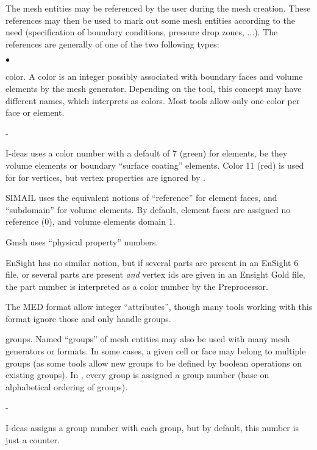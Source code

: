 {{{The mesh entities may be referenced by the user during the mesh
creation. These references may then be used to mark out some mesh entities
according to the need (specification of boundary conditions, pressure
drop zones, ...). The references are generally of one of the two
following types:
\begin{list}{$\bullet$}{}
\item color.
A color is an integer possibly associated with boundary faces and
volume elements by the mesh generator. Depending on the tool,
this concept may have different names, which \CS interprets
as colors. Most tools allow only one color per face or element.
      \begin{list}{-}{}
      \item I-deas uses a color number with a default of
            7 (green) for elements, be they volume elements or boundary
            ``surface coating'' elements. Color 11 (red) is used for
            for vertices, but vertex properties are ignored by \CS.
      \item SIMAIL uses the equivalent notions of ``reference''
            for element faces, and ``subdomain'' for volume elements.
            By default, element faces are assigned no reference (0),
            and volume elements domain 1.
      \item Gmsh uses ``physical property'' numbers.
      \item EnSight has no similar notion, but if several parts
            are present in an EnSight 6 file, or several parts
            are present \emph{and} vertex ids are given in an
            Ensight Gold file, the part number is interpreted as
            a color number by the Preprocessor.
      \item The MED format allow integer ``attributes'', though
            many tools working with this format ignore those
            and only handle groups.
      \end{list}
\item groups.
Named ``groups'' of mesh entities may also be used with many
mesh generators or formats. In some cases, a given cell or face may belong
to multiple groups (as some tools allow new groups to be defined
by boolean operations on existing groups).
In \CS, every group is assigned a group number (base on alphabetical
ordering of groups).
      \begin{list}{-}{}
      \item I-deas assigns a group number with each
            group, but by default, this number is just a counter.

\end{list}
\end{list}}}}
